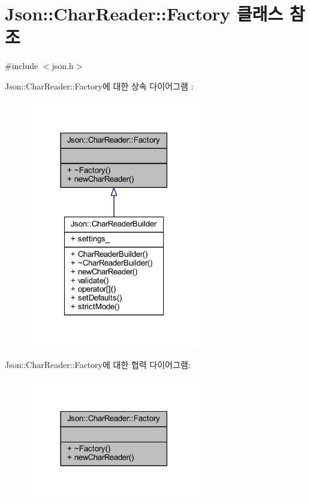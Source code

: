 \hypertarget{class_json_1_1_char_reader_1_1_factory}{}\section{Json\+:\+:Char\+Reader\+:\+:Factory 클래스 참조}
\label{class_json_1_1_char_reader_1_1_factory}


{\ttfamily \#include $<$json.\+h$>$}



Json\+:\+:Char\+Reader\+:\+:Factory에 대한 상속 다이어그램 \+: \nopagebreak
\begin{figure}[H]
\begin{center}
\leavevmode
\includegraphics[width=213pt]{class_json_1_1_char_reader_1_1_factory__inherit__graph}
\end{center}
\end{figure}


Json\+:\+:Char\+Reader\+:\+:Factory에 대한 협력 다이어그램\+:\nopagebreak
\begin{figure}[H]
\begin{center}
\leavevmode
\includegraphics[width=213pt]{class_json_1_1_char_reader_1_1_factory__coll__graph}
\end{center}
\end{figure}
